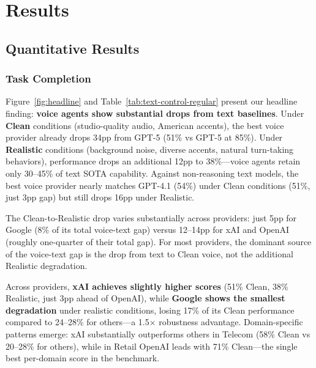 \section{Results}
\label{sec:results}

\subsection{Quantitative Results}

\subsubsection{Task Completion}

Figure~\ref{fig:headline} and Table~\ref{tab:text-control-regular} present our headline finding: \textbf{voice agents show substantial drops from text baselines}. Under \textbf{Clean} conditions (studio-quality audio, American accents), the best voice provider already drops 34pp from GPT-5 (51\% vs GPT-5 at 85\%). Under \textbf{Realistic} conditions (background noise, diverse accents, natural turn-taking behaviors), performance drops an additional 12pp to 38\%---voice agents retain only 30--45\% of text SOTA capability. Against non-reasoning text models, the best voice provider nearly matches GPT-4.1 (54\%) under Clean conditions (51\%, just 3pp gap) but still drops 16pp under Realistic.

\begin{table}[h]
\caption{Text vs Voice comparison (pass@1). Text shows GPT-5 (reasoning) and GPT-4.1 (non-reasoning). Voice evaluated under Clean and Realistic conditions. Deltas show gap from GPT-5.}
\label{tab:text-control-regular}
\centering
\begin{small}
\resizebox{\columnwidth}{!}{%

}
\end{small}
\end{table}

The Clean-to-Realistic drop varies substantially across providers: just 5pp for Google (8\% of its total voice-text gap) versus 12--14pp for xAI and OpenAI (roughly one-quarter of their total gap). For most providers, the dominant source of the voice-text gap is the drop from text to Clean voice, not the additional Realistic degradation.


Across providers, \textbf{xAI achieves slightly higher scores} (51\% Clean, 38\% Realistic, just 3pp ahead of OpenAI), while \textbf{Google shows the smallest degradation} under realistic conditions, losing 17\% of its Clean performance compared to 24--28\% for others---a 1.5$\times$ robustness advantage. Domain-specific patterns emerge: xAI substantially outperforms others in Telecom (58\% Clean vs 20--28\% for others), while in Retail OpenAI leads with 71\% Clean---the single best per-domain score in the benchmark.


